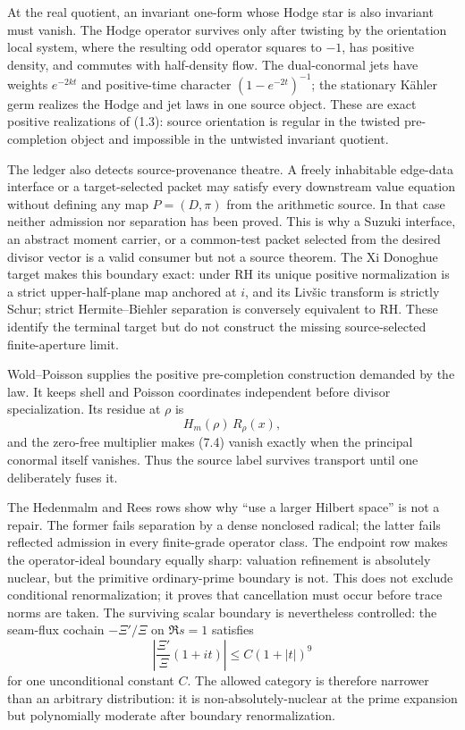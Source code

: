 \documentclass[11pt]{article}
\theoremstyle{definition}
\theoremstyle{remark}
\begin{document}
At the real quotient, an invariant one-form whose Hodge star is also invariant must vanish.  The
Hodge operator survives only after twisting by the orientation local system, where the resulting
odd operator squares to $-1$, has positive density, and commutes with half-density flow.  The
dual-conormal jets have weights $e^{-2kt}$ and positive-time character
$(1-e^{-2t})^{-1}$; the stationary K\"ahler germ realizes the Hodge and jet laws in one source
object.  These are exact positive realizations of (1.3): source orientation is regular in the
twisted pre-completion object and impossible in the untwisted invariant quotient.

The ledger also detects source-provenance theatre.  A freely inhabitable edge-data interface or a
target-selected packet may satisfy every downstream value equation without defining any map
$P=(D,\pi)$ from the arithmetic source.  In that case neither admission nor separation has been
proved.  This is why a Suzuki interface, an abstract moment carrier, or a common-test packet
selected from the desired divisor vector is a valid consumer but not a source theorem.
The Xi Donoghue target makes this boundary exact: under RH its unique positive normalization is a
strict upper-half-plane map anchored at $i$, and its Liv\v{s}ic transform is strictly Schur;
strict Hermite--Biehler separation is conversely equivalent to RH.  These identify the terminal
target but do not construct the missing source-selected finite-aperture limit.

Wold--Poisson supplies the positive pre-completion construction demanded by the law.  It keeps
shell and Poisson coordinates independent before divisor specialization.  Its residue at $\rho$
is
\[
 H_m(\rho)\,R_\rho(x),
 \tag{7.4}
\]
and the zero-free multiplier makes (7.4) vanish exactly when the principal conormal itself
vanishes.  Thus the source label survives transport until one deliberately fuses it.

The Hedenmalm and Rees rows show why ``use a larger Hilbert space'' is not a repair.  The former
fails separation by a dense nonclosed radical; the latter fails reflected admission in every
finite-grade operator class.  The endpoint row makes the operator-ideal boundary equally sharp:
valuation refinement is absolutely nuclear, but the primitive ordinary-prime boundary is not.
This does not exclude conditional renormalization; it proves that cancellation must occur before
trace norms are taken.  The surviving scalar boundary is nevertheless controlled:
the seam-flux cochain $-\Xi'/\Xi$ on $\Re s=1$ satisfies
\[
 \left|\frac{\Xi'}{\Xi}(1+it)\right|\leq C(1+|t|)^9
 \tag{7.5}
\]
for one unconditional constant $C$.  The allowed category is therefore narrower than an
arbitrary distribution: it is non-absolutely-nuclear at the prime expansion but polynomially
moderate after boundary renormalization.
\end{document}
